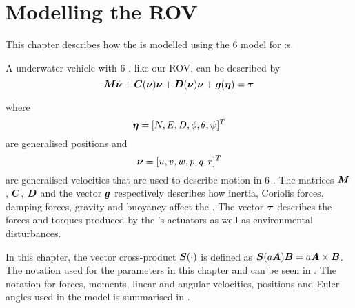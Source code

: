 \chapter{Modelling the ROV} \label{cha:modelling}
This chapter describes how the \abbrROV is modelled using the \citet{fossen2011} 6 \abbrDOF model for \abbrROV:s.

A underwater vehicle with 6 \abbrDOF, like our ROV, can be described by
\begin{equation} \label{eq:model}
 \boldsymbol{M} \dot{\boldsymbol{\nu}} + \boldsymbol{C}(\boldsymbol{\nu})\boldsymbol{\nu} + \boldsymbol{D}(\boldsymbol{\nu})\boldsymbol{\nu} + \boldsymbol{g}(\boldsymbol{\eta}) = \boldsymbol{\tau}
\end{equation}
 
where
\begin{equation*}
  \boldsymbol{\eta} = [N, E, D, \phi, \theta, \psi]^T  
\end{equation*} are generalised positions and
\begin{equation*}
  \boldsymbol{\nu} = [u, v, w, p, q, r]^T 
\end{equation*}
are generalised velocities that are used to describe motion in 6 \abbrDOF. The matrices $\boldsymbol{M}$, $\boldsymbol{C}$, $\boldsymbol{D}$ and the vector $\boldsymbol{g}$ respectively describes how inertia, Coriolis forces, damping forces, gravity and buoyancy affect the \abbrROV. The vector $\boldsymbol{\tau}$ describes the forces and torques produced by the \abbrROV's actuators as well as environmental disturbances.
 
In this chapter, the vector cross-product $\boldsymbol{S}(\cdot)$ is defined as $\boldsymbol{S}(a\boldsymbol{A}) \boldsymbol{B} = a\boldsymbol{A} \times \boldsymbol{B}$. The notation used for the parameters in this chapter and  can be seen in . The notation for forces, moments, linear and angular velocities, positions and Euler angles used in the model is summarised in . 

